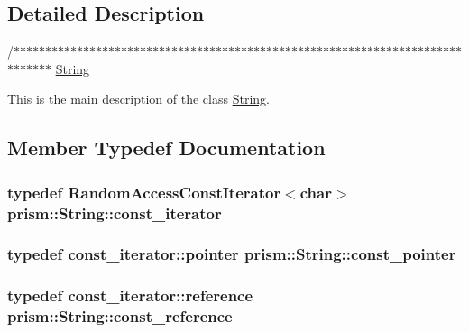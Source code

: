 \subsection{Detailed Description}
/$\ast$$\ast$$\ast$$\ast$$\ast$$\ast$$\ast$$\ast$$\ast$$\ast$$\ast$$\ast$$\ast$$\ast$$\ast$$\ast$$\ast$$\ast$$\ast$$\ast$$\ast$$\ast$$\ast$$\ast$$\ast$$\ast$$\ast$$\ast$$\ast$$\ast$$\ast$$\ast$$\ast$$\ast$$\ast$$\ast$$\ast$$\ast$$\ast$$\ast$$\ast$$\ast$$\ast$$\ast$$\ast$$\ast$$\ast$$\ast$$\ast$$\ast$$\ast$$\ast$$\ast$$\ast$$\ast$$\ast$$\ast$$\ast$$\ast$$\ast$$\ast$$\ast$$\ast$$\ast$$\ast$$\ast$$\ast$$\ast$$\ast$$\ast$$\ast$$\ast$$\ast$$\ast$$\ast$$\ast$$\ast$$\ast$ \hyperlink{classprism_1_1_string}{String}

This is the main description of the class \hyperlink{classprism_1_1_string}{String}. 

\subsection{Member Typedef Documentation}
\subsubsection[{\texorpdfstring{const\+\_\+iterator}{const_iterator}}]{\setlength{\rightskip}{0pt plus 5cm}typedef Random\+Access\+Const\+Iterator$<$char$>$ {\bf prism\+::\+String\+::const\+\_\+iterator}}\hypertarget{classprism_1_1_string_a8b46f0fbe9c5c94ba892975242e3ab68}{}\label{classprism_1_1_string_a8b46f0fbe9c5c94ba892975242e3ab68}
\subsubsection[{\texorpdfstring{const\+\_\+pointer}{const_pointer}}]{\setlength{\rightskip}{0pt plus 5cm}typedef const\+\_\+iterator\+::pointer {\bf prism\+::\+String\+::const\+\_\+pointer}}\hypertarget{classprism_1_1_string_adbea4cbf0f4f62948eb2accf7d402456}{}\label{classprism_1_1_string_adbea4cbf0f4f62948eb2accf7d402456}
\subsubsection[{\texorpdfstring{const\+\_\+reference}{const_reference}}]{\setlength{\rightskip}{0pt plus 5cm}typedef const\+\_\+iterator\+::reference {\bf prism\+::\+String\+::const\+\_\+reference}}\hypertarget{classprism_1_1_string_a7825c62cb2047e36ec704a17ef94f299}{}\label{classprism_1_1_string_a7825c62cb2047e36ec704a17ef94f299}
